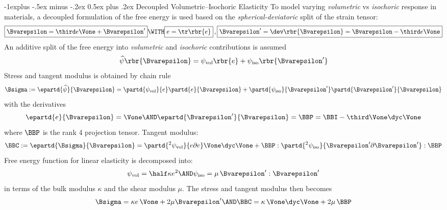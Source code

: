 \documentclass[10pt,landscape]{article}
\makeatletter
\def\Bveps{\Bvarepsilon}
\renewcommand{\subsection}{\@startsection{subsection}{2}{0mm}%
                                {-1explus -.5ex minus -.2ex}%
                                {0.5ex plus .2ex}%
                                {\normalfont\normalsize\bfseries}}
\makeatother
\begin{document}
\begin{multicols*}{3}
\subsection{Decoupled Volumetric--Isochoric Elasticity}
To model varying \emph{volumetric} vs \emph{isochoric} response in materials, a
decoupled formulation of the free energy is used based on the
\emph{spherical-deviatoric} split of the strain tensor:
\begin{equation}
  \boxed{\Bveps = \third e \Vone + \Bveps'}
  \WITH \boxed{e=\tr\rbr{e}}\, ,
  \boxed{\Bveps'=\dev\rbr{\Bveps} = \Bveps - \third e \Vone} \label{eq:split1}
\end{equation}
An additive split of the free energy into \emph{volumetric} and \emph{isochoric}
contributions is assumed
\begin{equation}
  \widehat{\psi}\rbr{\Bveps}=\psi_\textup{vol}\rbr{e} + \psi_\textup{iso}\rbr{\Bveps'}
\end{equation}
Stress and tangent modulus is obtained by chain rule
\begin{equation}
  \Bsigma := \epartd{\widehat{\psi}}{\Bveps} =
  \partd{\psi_\textup{vol}}{e}\partd{e}{\Bveps}
  + \partd{\psi_\textup{iso}}{\Bveps'}\partd{\Bveps'}{\Bveps}
\end{equation}
with the derivatives
\begin{equation}
  \epartd{e}{\Bveps} = \Vone \AND \epartd{\Bveps'}{\Bveps} = \BBP = \BBI -\third\Vone\dyc\Vone
\end{equation}
where $\BBP$ is the rank 4 projection tensor. Tangent modulus:
\begin{equation}
  \BBC := \epartd{\Bsigma}{\Bveps}
  = \partd{^2\psi_\textup{vol}}{e\partial e} \Vone\dyc\Vone
  + \BBP : \partd{^2\psi_\textup{iso}}{\Bveps'\partial\Bveps'}:\BBP
\end{equation}
Free energy function for linear elasticity is decomposed into:
\begin{equation}
  \psi_\textup{vol}=\half\kappa e^2 \AND \psi_\textup{iso}=\mu\,\Bveps':\Bveps'
\end{equation}
in terms of the bulk modulus $\kappa$ and the shear modulus $\mu$. The stress
and tangent modulus then becomes
\begin{equation}
  \Bsigma=\kappa e\,\Vone+2\mu\Bveps' \AND \BBC=\kappa\,\Vone\dyc\Vone+2\mu\,\BBP
\end{equation}

\end{multicols*}
\end{document}
